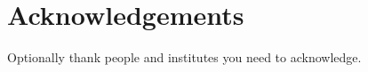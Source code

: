 \section*{Acknowledgements}
\label{} 

Optionally thank people and institutes you need to acknowledge. 
